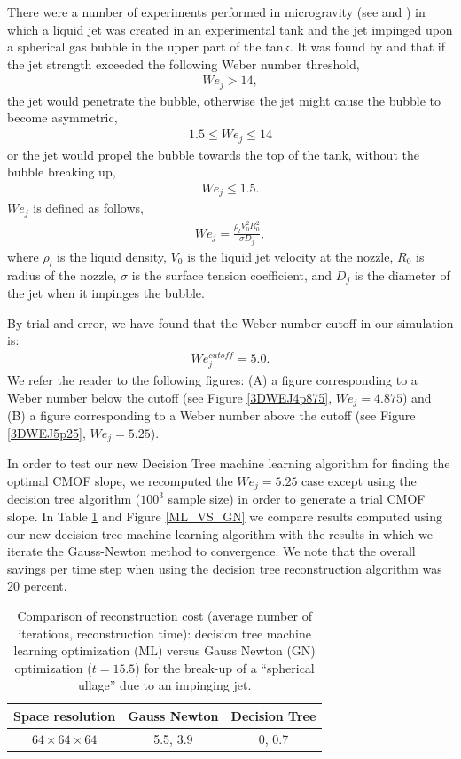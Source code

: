 \documentclass[]{article}
\begin{document}
There were a number of experiments performed in microgravity
(see \cite{bentz1992jet} and \cite{bentz1993low})
in which a liquid jet was created in an experimental tank and the
jet impinged upon a spherical gas bubble in the upper part of the
tank.  It was found by 
\cite{bentz1992jet} and \cite{bentz1993low} that if the jet strength
exceeded the following Weber number threshold, 
\begin{eqnarray*}
We_{j}>14,
\end{eqnarray*}
the jet would penetrate the 
bubble, otherwise the jet might cause the bubble to become 
asymmetric, 
\begin{eqnarray*}
1.5\le We_{j}\le 14
\end{eqnarray*}
or the jet would propel the bubble towards the
top of the tank, without the bubble breaking up,
\begin{eqnarray*}
We_{j}\le 1.5.
\end{eqnarray*}
$We_{j}$ is defined as follows,
\begin{eqnarray*}
We_{j}=\frac{\rho_{l} V_{0}^{2} R_{0}^{2}}{\sigma D_{j}},
\end{eqnarray*}
where $\rho_{l}$ is the liquid density, $V_{0}$ is the liquid
jet velocity at the nozzle, $R_{0}$ is radius of the nozzle,
$\sigma$ is the surface tension coefficient, and $D_{j}$ is the 
diameter of 
the jet when it impinges the bubble. 

By trial and error, we have found that the Weber number cutoff in
our simulation is:
\begin{eqnarray*}
We_{j}^{cutoff}=5.0.
\end{eqnarray*}
We refer the reader to the following figures: 
(A) a figure corresponding to a Weber number
below the cutoff (see Figure \ref{3DWEJ4p875}, $We_{j}=4.875$) and
(B) a figure corresponding to a Weber number
above the cutoff (see Figure \ref{3DWEJ5p25}, $We_{j}=5.25$).

In order to test our new Decision Tree machine learning algorithm for 
finding the optimal CMOF slope, we recomputed the $We_{j}=5.25$ case
except using the decision tree algorithm ($100^3$ sample size) in order
to generate a trial CMOF slope. In Table \ref{3DCOST} and
Figure \ref{ML_VS_GN} we compare results
computed using our new decision tree machine learning algorithm with 
the results in which we iterate the Gauss-Newton method to convergence.  
We note that the overall savings per time step when using the 
decision tree reconstruction algorithm was 20 percent.

\begin{table}[h!]
\caption{Comparison of reconstruction cost 
 (average number of iterations, reconstruction time): 
  decision tree
  machine learning optimization (ML) versus 
  Gauss Newton (GN)
  optimization ($t=15.5$) for the break-up of a ``spherical ullage'' due
  to an impinging jet.  }
 \centering
\begin{tabular}{|c|c|c|}
\hline
Space resolution &  Gauss Newton & Decision Tree   \\ \hline
$64\times 64\times 64$   & 5.5, 3.9 & 0, 0.7  \\ \hline
\end{tabular}
\label{3DCOST}
\end{table}
\end{document}
